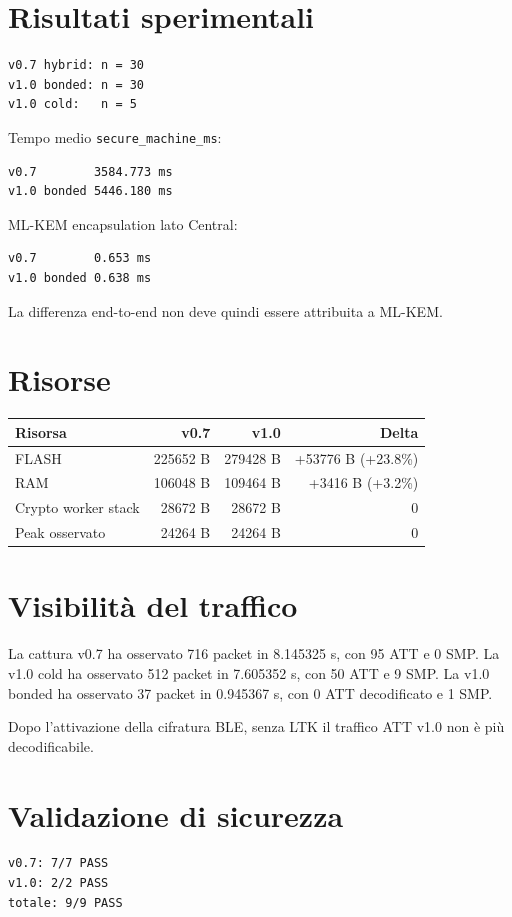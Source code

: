 \documentclass[11pt,a4paper]{article}
\begin{document}
\section{Risultati sperimentali}
\begin{verbatim}
v0.7 hybrid: n = 30
v1.0 bonded: n = 30
v1.0 cold:   n = 5
\end{verbatim}

Tempo medio \texttt{secure\_machine\_ms}:
\begin{verbatim}
v0.7        3584.773 ms
v1.0 bonded 5446.180 ms
\end{verbatim}

ML-KEM encapsulation lato Central:
\begin{verbatim}
v0.7        0.653 ms
v1.0 bonded 0.638 ms
\end{verbatim}

La differenza end-to-end non deve quindi essere attribuita a ML-KEM.

\section{Risorse}
\begin{center}
\begin{tabular}{lrrr}
\toprule
Risorsa & v0.7 & v1.0 & Delta \\
\midrule
FLASH & 225652 B & 279428 B & +53776 B (+23.8\%) \\
RAM & 106048 B & 109464 B & +3416 B (+3.2\%) \\
Crypto worker stack & 28672 B & 28672 B & 0 \\
Peak osservato & 24264 B & 24264 B & 0 \\
\bottomrule
\end{tabular}
\end{center}

\section{Visibilità del traffico}
La cattura v0.7 ha osservato 716 packet in 8.145325 s, con 95 ATT e 0 SMP.
La v1.0 cold ha osservato 512 packet in 7.605352 s, con 50 ATT e 9 SMP.
La v1.0 bonded ha osservato 37 packet in 0.945367 s, con 0 ATT decodificato e 1 SMP.

Dopo l'attivazione della cifratura BLE, senza LTK il traffico ATT v1.0 non è più decodificabile.

\section{Validazione di sicurezza}
\begin{verbatim}
v0.7: 7/7 PASS
v1.0: 2/2 PASS
totale: 9/9 PASS
\end{verbatim}
\end{document}

